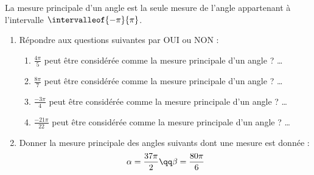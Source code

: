 \documentclass[10pt,french]{book}
\begin{document}
\exo La mesure principale d'un angle est la seule mesure de l'angle appartenant à l'intervalle $\intervalleof{-\pi}{\pi}$.
\begin{enumerate}
    \item Répondre aux questions suivantes par OUI ou NON :
    \begin{enumerate}
        \item $\frac{4\pi}{5}$ peut être considérée comme la mesure principale d'un angle ? \ldots\smallskip
        \item $\frac{8\pi}{7}$ peut être considérée comme la mesure principale d'un angle ? \ldots\smallskip
        \item $\frac{-3\pi}{4}$ peut être considérée comme la mesure principale d'un angle ? \ldots\smallskip
        \item $\frac{-21\pi}{22}$ peut être considérée comme la mesure principale d'un angle ? \ldots
    \end{enumerate}
    \item Donner la mesure principale des angles suivants dont une mesure est donnée :
    \[\alpha = \dfrac{37\pi}{2} \qq \beta = \dfrac{80\pi}{6}\]
\end{enumerate}
\end{document}
